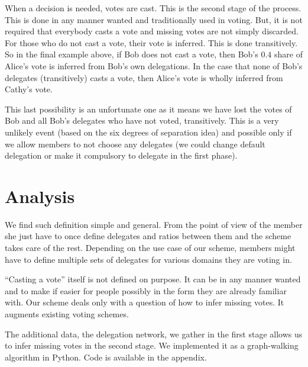 \documentclass[a4paper]{acm_proc_article-sp}
\begin{document}
When a decision is needed, votes are cast. This is the second stage of the process. This is done in any manner wanted and
traditionally used in voting. But, it is not required that everybody casts a vote and missing votes are not
simply discarded. For those who do not cast a vote, their vote is inferred. This is done transitively. So in the final example
above, if Bob does not cast a vote, then Bob's $0.4$ share of Alice's vote is inferred from Bob's own delegations. In the
case that none of Bob's delegates (transitively) casts a vote, then Alice's vote is wholly inferred from Cathy's vote.

This last possibility is an unfortunate one as it means we have lost the votes of Bob and all Bob's delegates who have not
voted, transitively. This is a very unlikely event (based on the six degrees of separation idea) and possible only if we allow
members to not choose any delegates (we could change default delegation or make it compulsory to delegate in the first phase).

\section{Analysis}

We find such definition simple and general. From the point of view of the member she just have to once define delegates and ratios
between them and the scheme takes care of the rest. Depending on the use case of our scheme, members might have to define
multiple sets of delegates for various domains they are voting in.

``Casting a vote'' itself is not defined on purpose. It can be in any manner wanted and to make if easier for people possibly
in the form they are already familiar with. Our scheme deals only with a question of how to infer missing votes. It augments
existing voting schemes.

The additional data, the delegation network, we gather in the first stage allows us to infer missing votes in the second stage.
We implemented it as a graph-walking algorithm in Python. Code is available in the appendix.




\end{document}
